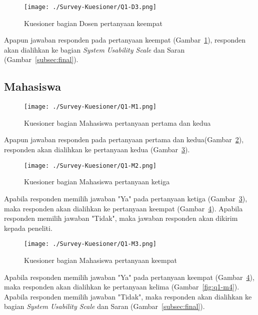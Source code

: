 \begin{figure}[H]
	\centering  
	\texttt{[image: ./Survey-Kuesioner/Q1-D3.png]}  
	\caption[Kuesioner bagian Dosen pertanyaan keempat]{Kuesioner bagian Dosen pertanyaan keempat} 
	\label{fig:q1-d3} 
\end{figure}

Apapun jawaban responden pada pertanyaan keempat (Gambar~\ref{fig:q1-d3}), responden akan dialihkan ke bagian \textit{System Usability Scale} dan Saran (Gambar~\ref{subsec:final}).

\subsection{Mahasiswa}
\label{subsec:survey-mahasiswa}
\begin{figure}[H]
	\centering  
	\texttt{[image: ./Survey-Kuesioner/Q1-M1.png]}  
	\caption[Kuesioner bagian Mahasiswa pertanyaan pertama dan kedua]{Kuesioner bagian Mahasiswa pertanyaan pertama dan kedua} 
	\label{fig:q1-m1} 
\end{figure}

Apapun jawaban responden pada pertanyaan pertama dan kedua(Gambar~\ref{fig:q1-m1}), responden akan dialihkan ke pertanyaan kedua (Gambar~\ref{fig:q1-m2}).

\begin{figure}[H]
	\centering  
	\texttt{[image: ./Survey-Kuesioner/Q1-M2.png]}  
	\caption[Kuesioner bagian Mahasiswa pertanyaan ketiga]{Kuesioner bagian Mahasiswa pertanyaan ketiga} 
	\label{fig:q1-m2} 
\end{figure}

Apabila responden memilih jawaban "Ya" pada pertanyaan ketiga (Gambar~\ref{fig:q1-m2}), maka responden akan dialihkan ke pertanyaan keempat (Gambar~\ref{fig:q1-m3}). Apabila responden memilih jawaban "Tidak", maka jawaban responden akan dikirim kepada peneliti.

\begin{figure}[H]
	\centering  
	\texttt{[image: ./Survey-Kuesioner/Q1-M3.png]}  
	\caption[Kuesioner bagian Mahasiswa pertanyaan keempat]{Kuesioner bagian Mahasiswa pertanyaan keempat} 
	\label{fig:q1-m3} 
\end{figure}

Apabila responden memilih jawaban "Ya" pada pertanyaan keempat (Gambar~\ref{fig:q1-m3}), maka responden akan dialihkan ke pertanyaan kelima (Gambar~\ref{fig:q1-m4}). Apabila responden memilih jawaban "Tidak", maka responden akan dialihkan ke bagian \textit{System Usability Scale} dan Saran (Gambar~\ref{subsec:final}).

